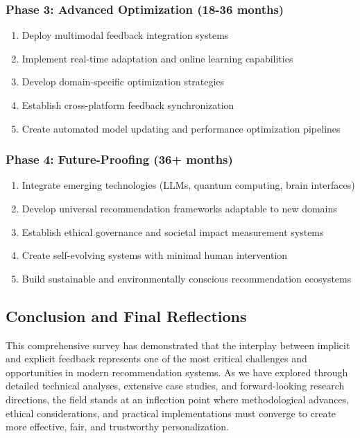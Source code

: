 \documentclass[acmsmall,review,anonymous]{acmart}
\begin{document}
\subsubsection{Phase 3: Advanced Optimization (18-36 months)}

\begin{enumerate}
    \item Deploy multimodal feedback integration systems
    \item Implement real-time adaptation and online learning capabilities
    \item Develop domain-specific optimization strategies
    \item Establish cross-platform feedback synchronization
    \item Create automated model updating and performance optimization pipelines
\end{enumerate}

\subsubsection{Phase 4: Future-Proofing (36+ months)}

\begin{enumerate}
    \item Integrate emerging technologies (LLMs, quantum computing, brain interfaces)
    \item Develop universal recommendation frameworks adaptable to new domains
    \item Establish ethical governance and societal impact measurement systems
    \item Create self-evolving systems with minimal human intervention
    \item Build sustainable and environmentally conscious recommendation ecosystems
\end{enumerate}

\subsection{Conclusion and Final Reflections}

This comprehensive survey has demonstrated that the interplay between implicit and explicit feedback represents one of the most critical challenges and opportunities in modern recommendation systems. As we have explored through detailed technical analyses, extensive case studies, and forward-looking research directions, the field stands at an inflection point where methodological advances, ethical considerations, and practical implementations must converge to create more effective, fair, and trustworthy personalization.
\end{document}
